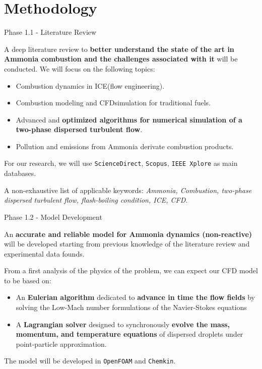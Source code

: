 \section{Methodology}

\begin{frame}{Phase 1.1 - Literature Review}

    A deep literature review to \textbf{better understand the state of the art in Ammonia combustion and the challenges associated with it} will be conducted.
    We will focus on the following topics:

    \begin{itemize}
        \item Combustion dynamics in ICE\footnotemark[1] (flow engineering).
        \item Combustion modeling and CFD\footnotemark[2] simulation for traditional fuels.
        \item Advanced and \textbf{optimized algorithms for numerical simulation of a two-phase dispersed turbulent flow}.
        \item Pollution and emissions from Ammonia derivate combustion products.
    \end{itemize}

    For our research, we will use \texttt{ScienceDirect}, \texttt{Scopus}, \texttt{IEEE Xplore} as main databases.

    A non-exhaustive list of applicable keywords: \textit{Ammonia, Combustion, two-phase dispersed turbulent flow, flash-boiling condition, ICE, CFD}.


\end{frame}



\begin{frame}{Phase 1.2 - Model Development}

    An \textbf{accurate and reliable model for Ammonia dynamics (non-reactive)} will be developed starting from previous knowledge of the literature review and experimental data founds.

    From a first analysis of the physics of the problem, we can expect our CFD model to be based on:

    \begin{itemize}
        \item An \textbf{Eulerian algorithm} dedicated to \textbf{advance in time the flow fields} by solving the Low-Mach number formulations of the Navier-Stokes equations
        \item A \textbf{Lagrangian solver} designed to synchronously \textbf{evolve the mass, momentum, and temperature equations} of dispersed droplets under point-particle approximation.
    \end{itemize}

    The model will be developed in \texttt{OpenFOAM} and \texttt{Chemkin}.

\end{frame}



